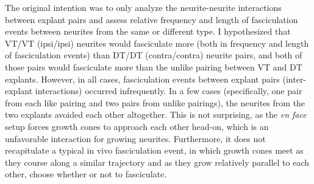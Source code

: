 The original intention was to only analyze the neurite-neurite interactions between explant pairs and assess relative frequency and length of fasciculation events between neurites from the same or different type.
I hypothesized that VT/VT (ipsi/ipsi) neurites would fasciculate more (both in frequency and length of fasciculation events) than DT/DT (contra/contra) neurite pairs, and both of those pairs would fasciculate more than the unlike pairing between VT and DT explants.
However, in all cases, fasciculation events between explant pairs (inter-explant interactions) occurred infrequently.
In a few cases (specifically, one pair from each like pairing and two pairs from unlike pairings), the neurites from the two explants avoided each other altogether.
This is not surprising, as the \emph{en face} setup forces growth cones to approach each other head-on, which is an unfavorable interaction for growing neurites.
Furthermore, it does not recapitulate a typical in vivo fasciculation event, in which growth cones meet as they course along a similar trajectory and as they grow relatively parallel to each other, choose whether or not to fasciculate.

